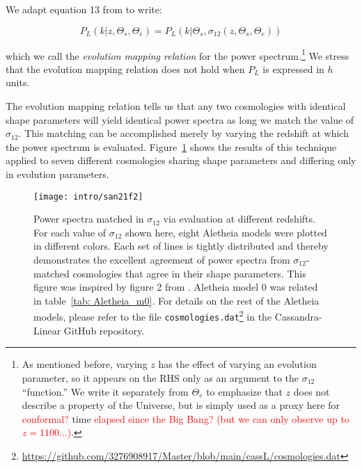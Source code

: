 We adapt equation 13 from \citet{San21} to write:

\begin{equation}
\label{eq: evMapping_pSpectrum}
    P_L (k | z, \Theta_s, \Theta_e)
    =
    P_L (k | \Theta_s, \sigma_{12} \left( z, \Theta_s, \Theta_e \right))
\end{equation}

which we call the \textit{evolution mapping relation} for the power
spectrum.\footnote{As mentioned before, varying $z$ has the effect of varying 
an evolution parameter, so it appears on the RHS only as an argument 
to the $\sigma_{12}$ ``function.'' We write it separately from
$\Theta_e$ to
emphasize that $z$ does not describe a property of the Universe, but is
simply used as a proxy here for \textcolor{red}{conformal?} time
\textcolor{red}{elapsed since the Big Bang? (but we can only observe up to
$z = 1100$...)}.} 
We stress that the evolution mapping relation does not hold when $P_L$ is
expressed in $h$ units.


The evolution mapping relation tells us that any two cosmologies with 
identical shape
parameters will yield identical power spectra as long we match the value of
$\sigma_{12}$. This matching can be accomplished merely by varying the 
redshift at which the power spectrum is evaluated.
Figure~\ref{fig: ev_mapping_demo} shows the results of this technique applied
to seven different cosmologies sharing shape parameters and differing only
in evolution parameters.

\begin{figure}[ht!]
  \centering
  \texttt{[image: intro/san21f2]}
  \cprotect\caption[Demonstration of evolution mapping]{Power spectra matched
  	in $\sigma_{12}$ via evaluation at different redshifts. For each value of
  	$\sigma_{12}$
  	shown here, eight Aletheia models were plotted in different
  	colors. Each set of lines is tightly distributed and thereby demonstrates 
  	the excellent agreement of power spectra from $\sigma_{12}$-matched
  	cosmologies that agree in their shape parameters. This figure was
  	inspired by figure 2 from \citet{San21}. Aletheia model 0 was related in
  	table~\ref{tab: Aletheia_m0}. For details on the rest of the Aletheia
  	models, please refer to the file
  	\verb|cosmologies.dat|\footnote{\url{https://github.com/3276908917/Master/blob/main/cassL/cosmologies.dat}}
  	in the Cassandra-Linear GitHub repository.}
  \label{fig: ev_mapping_demo}
\end{figure}


